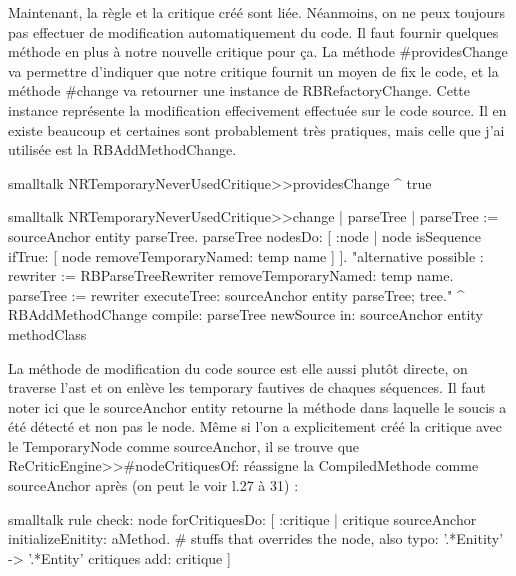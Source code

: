 \documentclass[10pt,twoside,english]{_support/latex/sbabook/sbabook}
\begin{document}
Maintenant, la r\`{e}gle et la critique cr\'{e}\'{e} sont li\'{e}e. N\'{e}anmoins, on ne peux
toujours pas effectuer de modification automatiquement du code. Il faut fournir
quelques m\'{e}thode en plus \`{a} notre nouvelle critique pour \c{c}a. La m\'{e}thode
\#providesChange va permettre d'indiquer que notre critique fournit un moyen de
fix le code, et la m\'{e}thode \#change va retourner une instance de
RBRefactoryChange. Cette instance repr\'{e}sente la modification effecivement
effectu\'{e}e sur le code source. Il en existe beaucoup et certaines sont
probablement tr\`{e}s pratiques, mais celle que j'ai utilis\'{e}e est la
RBAddMethodChange.
\begin{displaycode}{smalltalk}
NRTemporaryNeverUsedCritique>>providesChange
	^ true
\end{displaycode}
\begin{displaycode}{smalltalk}
NRTemporaryNeverUsedCritique>>change
	| parseTree |
	parseTree := sourceAnchor entity parseTree.
	parseTree
		nodesDo: [ :node |
			node isSequence
				ifTrue: [ node removeTemporaryNamed: temp name ] ].
	"alternative possible :
	rewriter := RBParseTreeRewriter removeTemporaryNamed: temp name.
	parseTree := rewriter executeTree: sourceAnchor entity parseTree; tree."
	^ RBAddMethodChange compile: parseTree newSource in: sourceAnchor entity methodClass
\end{displaycode}

La m\'{e}thode de modification du code source est elle aussi plut\^{o}t directe, on
traverse l'ast et on enl\`{e}ve les temporary fautives de chaques s\'{e}quences. Il
faut noter ici que le sourceAnchor entity retourne la m\'{e}thode dans laquelle le
soucis a \'{e}t\'{e} d\'{e}tect\'{e} et non pas le node. M\^{e}me si l'on a explicitement cr\'{e}\'{e} la
critique avec le TemporaryNode comme sourceAnchor, il se trouve que
ReCriticEngine\textgreater{}\textgreater{}\#nodeCritiquesOf: r\'{e}assigne la CompiledMethode comme
sourceAnchor apr\`{e}s (on peut le voir l.27 \`{a} 31) :
\begin{displaycode}{smalltalk}
rule
	check: node
	forCritiquesDo: [ :critique |
		critique sourceAnchor initializeEnitity: aMethod. 
		# stuffs that overrides the node, also typo: '.*Enitity' -> '.*Entity'
		critiques add: critique ]
\end{displaycode}
\end{document}
